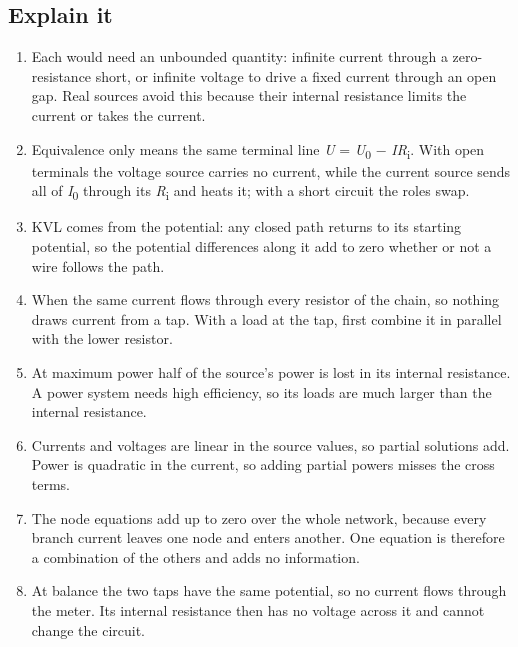 \documentclass[11pt]{article}
\begin{document}
\begin{keepsection}\subsection{Explain it}

\begin{enumerate}
\item Each would need an unbounded quantity: infinite current through a zero-resistance short, or infinite voltage to drive a fixed current through an open gap. Real sources avoid this because their internal resistance limits the current or takes the current.
\item Equivalence only means the same terminal line \textit{U} = \textit{U}\textsubscript{0} \ensuremath{-} \textit{I}\textit{R}\textsubscript{i}. With open terminals the voltage source carries no current, while the current source sends all of \textit{I}\textsubscript{0} through its \textit{R}\textsubscript{i} and heats it; with a short circuit the roles swap.
\item KVL comes from the potential: any closed path returns to its starting potential, so the potential differences along it add to zero whether or not a wire follows the path.
\item When the same current flows through every resistor of the chain, so nothing draws current from a tap. With a load at the tap, first combine it in parallel with the lower resistor.
\item At maximum power half of the source’s power is lost in its internal resistance. A power system needs high efficiency, so its loads are much larger than the internal resistance.
\item Currents and voltages are linear in the source values, so partial solutions add. Power is quadratic in the current, so adding partial powers misses the cross terms.
\item The node equations add up to zero over the whole network, because every branch current leaves one node and enters another. One equation is therefore a combination of the others and adds no information.
\item At balance the two taps have the same potential, so no current flows through the meter. Its internal resistance then has no voltage across it and cannot change the circuit.
\end{enumerate}

\end{keepsection}
\end{document}
